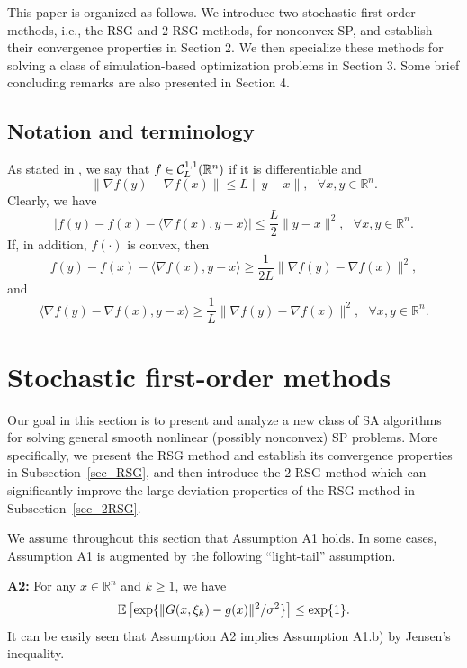 \documentclass[final]{siamltex}
\newcommand{\beq}{\begin{equation}}
\newcommand{\eeq}{\end{equation}}
\def\vgap{\vspace*{.1in}}
\def\exp{{\rm exp}}
\newcommand{\bbe}{\mathbb{E}}
\newcommand{\bbr}{\mathbb{R}}
\def\sigmasco{{\sigma}}
\def\cE{{\bbr^n}}
\begin{document}


This paper is organized as follows. We introduce two stochastic first-order methods,
i.e., the RSG and $2$-RSG methods,
for nonconvex SP, and establish their convergence properties in Section 2.
We then specialize these methods for solving a class of simulation-based optimization
problems in Section 3. Some brief concluding remarks are also presented in Section 4.

\subsection{Notation and terminology} \label{notation-sco}
As stated in \cite{Nest04}, we say that $f\in {\cal C}_L^{1,1}(\cE)$ if it is differentiable and
\[
\|\nabla f(y) - \nabla f(x)\| \le L\|y-x\|, \ \ \
\forall x, y \in \cE.
\]
Clearly, we have
\beq \label{smooth}
|f(y) - f(x) - \langle \nabla f(x), y - x \rangle | \le \frac{L}{2} \|y - x\|^2, \ \ \
\forall x, y  \in \cE.
\eeq
If, in addition, $f(\cdot)$ is convex, then
\beq \label{smooth_lb1}
f(y) - f(x) - \langle \nabla f(x), y - x \rangle \ge \frac {1}{2L} \|\nabla f(y) - \nabla f(x)\|^2,
\eeq
and
\beq \label{smooth_lb}
\langle \nabla f(y) - \nabla f(x), y - x \rangle \ge \frac {1}{L} \|\nabla f(y) - \nabla f(x)\|^2, \ \ \
\forall x, y \in \cE.
\eeq

\setcounter{equation}{0}
\section{Stochastic first-order methods} \label{sec_first}
Our goal in this section is to present and analyze a new class of SA algorithms
for solving general smooth nonlinear (possibly nonconvex) SP problems.
More specifically, we present the RSG method and
establish its convergence properties in Subsection~\ref{sec_RSG},
and then introduce the $2$-RSG method
which can significantly improve the large-deviation properties of the RSG method
in Subsection~\ref{sec_2RSG}.

We assume throughout this section that Assumption A1 holds.
In some cases, Assumption A1 is augmented by the following
``light-tail'' assumption.

\vgap

{\bf A2:} For any $x \in \bbr^n$ and $k \ge 1$, we have
\beq
\bbe\left[\exp \{\| G(x, \xi_k) - g(x) \|^2/\sigmasco^2 \}
\right] \leq \exp\{1\}. \label{ass2.a}
\eeq
It can be easily seen that Assumption A2 implies Assumption A1.b) by Jensen's inequality.
\end{document}
